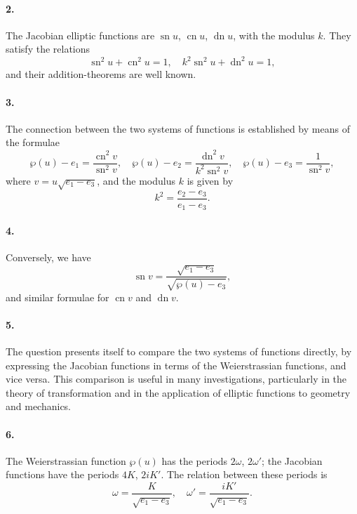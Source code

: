 \documentclass[11pt,a4paper]{book}
\begin{document}
\paragraph{2.} The Jacobian elliptic functions are $
\operatorname{sn} u$, $\operatorname{cn} u$, $\operatorname{dn} u$, with the modulus $k$. They satisfy the relations
\[
\operatorname{sn}^{2}u + \operatorname{cn}^{2}u = 1, \quad k^{2}\operatorname{sn}^{2}u + \operatorname{dn}^{2}u = 1,
\]
and their addition-theorems are well known.

\paragraph{3.} The connection between the two systems of functions is established by means of the formulae
\[
\wp(u) - e_{1} = \frac{\operatorname{cn}^{2}v}{\operatorname{sn}^{2}v}, \quad
\wp(u) - e_{2} = \frac{\operatorname{dn}^{2}v}{k^{2}\operatorname{sn}^{2}v}, \quad
\wp(u) - e_{3} = \frac{1}{\operatorname{sn}^{2}v},
\]
where $v = u\sqrt{e_{1} - e_{3}}$, and the modulus $k$ is given by
\[
k^{2} = \frac{e_{2} - e_{3}}{e_{1} - e_{3}}.
\]

\paragraph{4.} Conversely, we have
\[
\operatorname{sn} v = \frac{\sqrt{e_{1} - e_{3}}}{\sqrt{\wp(u) - e_{3}}},
\]
and similar formulae for $\operatorname{cn} v$ and $\operatorname{dn} v$.

\paragraph{5.} The question presents itself to compare the two systems of functions directly, by expressing the Jacobian functions in terms of the Weierstrassian functions, and vice versa\@. This comparison is useful in many investigations, particularly in the theory of transformation and in the application of elliptic functions to geometry and mechanics.

\paragraph{6.} The Weierstrassian function $\wp(u)$ has the periods $2\omega$, $2\omega'$; the Jacobian functions have the periods $4K$, $2iK'$. The relation between these periods is
\[
\omega = \frac{K}{\sqrt{e_{1} - e_{3}}}, \quad \omega' = \frac{iK'}{\sqrt{e_{1} - e_{3}}}.
\]
\end{document}
